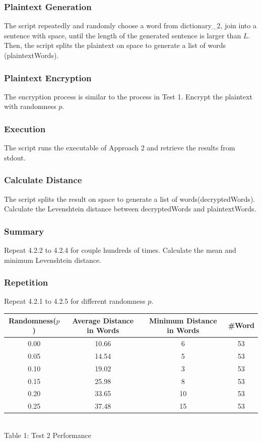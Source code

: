 \documentclass[12pt]{article}
\begin{document}
\subsubsection{Plaintext Generation}
The script repeatedly and randomly choose a word from dictionary_2, join into a sentence with space, until the length of the generated sentence is larger than $L$. Then, the script splits the plaintext on space to generate a list of words (plaintextWords).
\subsubsection{Plaintext Encryption}
The encryption process is similar to the process in Test 1. Encrypt the plaintext with randomness $p$.
\subsubsection{Execution}
The script runs the executable of Approach 2 and retrieve the results from stdout.
\subsubsection{Calculate Distance}
The script splits the result on space to generate a list of words(decryptedWords). Calculate the Levenshtein distance between decryptedWords and plaintextWords.
\subsubsection{Summary}
Repeat 4.2.2 to 4.2.4 for couple hundreds of times. Calculate the mean and minimum Levenshtein distance.
\subsubsection{Repetition}
Repeat 4.2.1 to 4.2.5 for different randomness $p$. \\

\begin{center}
\begin{tabular}{|c|c|c|c|} 
 \hline
 Randomness($p$) & Average Distance in Words & Minimum Distance in Words & #Word \\ [0.5ex] 
 \hline\hline
 0.00 & 10.66 & 6 & 53 \\ 
 \hline
 0.05 & 14.54 & 5 & 53 \\
 \hline
 0.10 & 19.02 & 3 & 53 \\
 \hline
 0.15 & 25.98 & 8 & 53 \\
 \hline
 0.20 & 33.65 & 10 & 53 \\
 \hline
 0.25 & 37.48 & 15 & 53 \\
 \hline
\end{tabular} \\
\caption{Table 1: Test 2 Performance}
\end{center}
\end{document}
